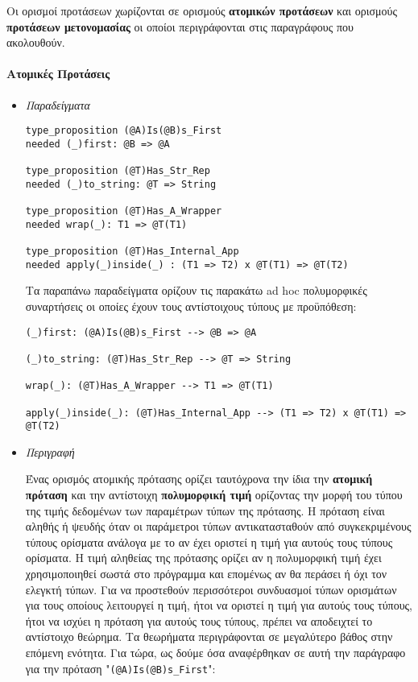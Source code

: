 \documentclass[diploma]{softlab-thesis}
\begin{document}
Οι ορισμοί προτάσεων χωρίζονται σε ορισμούς \textbf{ατομικών προτάσεων}
και ορισμούς \textbf{προτάσεων μετονομασίας} οι οποίοι περιγράφονται
στις παραγράφους που ακολουθούν.

\paragraph{Ατομικές Προτάσεις}

\begin{itemize}
\item \textit{Παραδείγματα}
\begin{verbatim}
type_proposition (@A)Is(@B)s_First
needed (_)first: @B => @A

type_proposition (@T)Has_Str_Rep
needed (_)to_string: @T => String

type_proposition (@T)Has_A_Wrapper
needed wrap(_): T1 => @T(T1)

type_proposition (@T)Has_Internal_App
needed apply(_)inside(_) : (T1 => T2) x @T(T1) => @T(T2)
\end{verbatim}
Τα παραπάνω παραδείγματα ορίζουν τις παρακάτω ad hoc πολυμορφικές συναρτήσεις
οι οποίες έχουν τους αντίστοιχους τύπους με προϋπόθεση:
\begin{verbatim}
(_)first: (@A)Is(@B)s_First --> @B => @A

(_)to_string: (@T)Has_Str_Rep --> @T => String

wrap(_): (@T)Has_A_Wrapper --> T1 => @T(T1)

apply(_)inside(_): (@T)Has_Internal_App --> (T1 => T2) x @T(T1) => @T(T2)
\end{verbatim}

\newpage

\item \textit{Περιγραφή}

Ένας ορισμός ατομικής πρότασης ορίζει ταυτόχρονα την ίδια την \textbf{ατομική
πρόταση} και την αντίστοιχη \textbf{πολυμορφική τιμή} ορίζοντας την μορφή του
τύπου της τιμής δεδομένων των παραμέτρων τύπων της πρότασης. Η πρόταση είναι
αληθής ή ψευδής όταν οι παράμετροι τύπων αντικατασταθούν από συγκεκριμένους
τύπους ορίσματα ανάλογα με το αν έχει οριστεί η τιμή για αυτούς τους τύπους
ορίσματα. Η τιμή αληθείας της πρότασης ορίζει αν η πολυμορφική τιμή έχει
χρησιμοποιηθεί σωστά στο πρόγραμμα και επομένως αν θα περάσει ή όχι τον ελεγκτή
τύπων. Για να προστεθούν περισσότεροι συνδυασμοί τύπων ορισμάτων για τους
οποίους λειτουργεί η τιμή, ήτοι να οριστεί η τιμή για αυτούς τους τύπους, ήτοι
να ισχύει η πρόταση για αυτούς τους τύπους, πρέπει να αποδειχτεί το αντίστοιχο
θεώρημα. Τα θεωρήματα περιγράφονται σε μεγαλύτερο βάθος στην επόμενη ενότητα.
Για τώρα, ως δούμε όσα αναφέρθηκαν σε αυτή την παράγραφο για την πρόταση
"\verb|(@A)Is(@B)s_First|":


\end{itemize}
\end{document}
